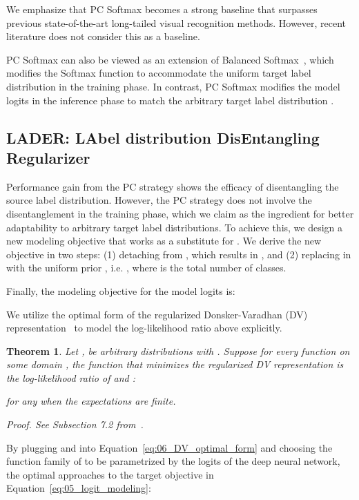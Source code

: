 \documentclass[final]{cvpr}
\newtheorem{theorem}{Theorem}
\begin{document}
We emphasize that PC Softmax becomes a strong baseline that surpasses previous state-of-the-art long-tailed visual recognition methods.
However, recent literature does not consider this as a baseline.

PC Softmax can also be viewed as an extension of Balanced Softmax~\cite{ren2020balanced}, which modifies the Softmax function to accommodate the uniform target label distribution in the training phase.
In contrast, PC Softmax modifies the model logits in the inference phase to match the arbitrary target label distribution .

\subsection{LADER: LAbel distribution DisEntangling Regularizer}\label{subsec:3_2_lader}
Performance gain from the PC strategy shows the efficacy of disentangling the source label distribution.
However, the PC strategy does not involve the disentanglement in the training phase, which we claim as the ingredient for better adaptability to arbitrary target label distributions.
To achieve this, we design a new modeling objective that works as a substitute for . 
We derive the new objective in two steps:
(1) detaching  from , which results in , and
(2) replacing  in  with the uniform prior , i.e. , where  is the total number of classes.

Finally, the modeling objective for the model logits is:

We utilize the optimal form of the regularized Donsker-Varadhan (DV) representation~\cite{donsker1985large,banerjee2006bayesian,belghazi2018mutual,choi2020regularized} to model the log-likelihood ratio above explicitly.
\begin{theorem}
\label{thm:02_dv}
 Let ,  be arbitrary distributions with . Suppose for every function  on some domain , the function  that minimizes the regularized DV representation is the log-likelihood ratio of  and :

for any  when the expectations are finite.
\newline

\noindent \textit{Proof.} See Subsection 7.2 from~\cite{choi2020regularized}.
\end{theorem}

By plugging  and  into Equation~\ref{eq:06_DV_optimal_form} and choosing the function family of  to be parametrized by the logits of the deep neural network, the optimal  approaches to the target objective in Equation~\ref{eq:05_logit_modeling}:
\end{document}
